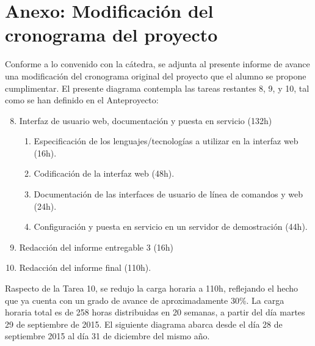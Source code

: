 \documentclass[12pt,bibliography=oldstyle,DIV=14,parskip=full-,titlepage]{scrartcl}
\begin{document}
\section*{Anexo: Modificación del cronograma del proyecto}
Conforme a lo convenido con la cátedra, se adjunta al presente
informe de avance una modificación del cronograma original del
proyecto que el alumno se propone cumplimentar.
El presente diagrama contempla las tareas restantes
8, 9, y 10, tal como se han definido en el Anteproyecto:
\begin{enumerate}
  \setcounter{enumi}{7}
\item Interfaz de usuario web, documentación y puesta en servicio (132h)
  \begin{enumerate}
  \item Especificación de los lenguajes/tecnologías a utilizar en la
    interfaz web (16h).
  \item Codificación de la interfaz web (48h).
  \item Documentación de las interfaces de usuario de línea de
    comandos y web (24h).
  \item Configuración y puesta en servicio en un servidor de demostración
    (44h).
  \end{enumerate}
\item Redacción del informe entregable 3 (16h)
\item Redacción del informe final (110h).
\end{enumerate}
Raspecto de la Tarea 10, se redujo la carga horaria a 110h, reflejando
el hecho que ya cuenta con un grado de avance de aproximadamente 30\%.
La carga horaria total es de 258 horas distribuidas en 20 semanas, a
partir del día martes 29 de septiembre de 2015.
El siguiente diagrama abarca desde el día 28 de septiembre 2015 al día
31 de diciembre del mismo año.
\end{document}
